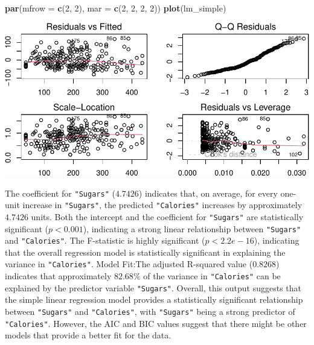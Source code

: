 \documentclass[
]{article}
\newenvironment{Shaded}{\begin{snugshade}}{\end{snugshade}}
\newcommand{\AttributeTok}[1]{\textcolor[rgb]{0.13,0.29,0.53}{#1}}
\newcommand{\DecValTok}[1]{\textcolor[rgb]{0.00,0.00,0.81}{#1}}
\newcommand{\FunctionTok}[1]{\textcolor[rgb]{0.13,0.29,0.53}{\textbf{#1}}}
\newcommand{\NormalTok}[1]{#1}
\begin{document}
\begin{Shaded}
\begin{Highlighting}[]
\FunctionTok{par}\NormalTok{(}\AttributeTok{mfrow =} \FunctionTok{c}\NormalTok{(}\DecValTok{2}\NormalTok{, }\DecValTok{2}\NormalTok{), }\AttributeTok{mar =} \FunctionTok{c}\NormalTok{(}\DecValTok{2}\NormalTok{, }\DecValTok{2}\NormalTok{, }\DecValTok{2}\NormalTok{, }\DecValTok{2}\NormalTok{))}
\FunctionTok{plot}\NormalTok{(lm\_simple)}
\end{Highlighting}
\end{Shaded}

\begin{center}\includegraphics{Statistical_Learning_Final_Report_files/figure-latex/simple_linear_regression-1} \end{center}

The coefficient for \texttt{"Sugars"} (\(4.7426\)) indicates that, on
average, for every one-unit increase in \texttt{"Sugars"}, the predicted
\texttt{"Calories"} increases by approximately \(4.7426\) units. Both
the intercept and the coefficient for \texttt{"Sugars"} are
statistically significant (\(p < 0.001\)), indicating a strong linear
relationship between \texttt{"Sugars"} and \texttt{"Calories"}. The
F-statistic is highly significant (\(p < 2.2e-16\)), indicating that the
overall regression model is statistically significant in explaining the
variance in \texttt{"Calories"}. Model Fit:The adjusted R-squared value
(\(0.8268\)) indicates that approximately \(82.68\)\% of the variance in
\texttt{"Calories"} can be explained by the predictor variable
\texttt{"Sugars"}. Overall, this output suggests that the simple linear
regression model provides a statistically significant relationship
between \texttt{"Sugars"} and \texttt{"Calories"}, with
\texttt{"Sugars"} being a strong predictor of \texttt{"Calories"}.
However, the AIC and BIC values suggest that there might be other models
that provide a better fit for the data.
\end{document}
